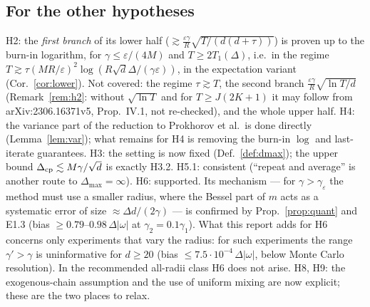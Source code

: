 \documentclass[11pt,a4paper]{article}
\numberwithin{equation}{section}
\theoremstyle{definition}
\theoremstyle{remark}
\newcommand{\Dmax}{\Delta_{\max}}\newcommand{\Dcp}{\Delta_{\rm cp}}
\begin{document}
\subsection{For the other hypotheses}
H2: the \emph{first branch} of its lower half ($\gtrsim\frac{\varepsilon\gamma}R\sqrt{T/(d(d+\tau))}$) is proven up to the burn-in logarithm, for $\gamma\le\varepsilon/(4M)$ and $T\ge2T_1(\Delta)$, i.e.\ in the regime $T\gtrsim\tau(MR/\varepsilon)^2\log(R\sqrt d\Delta/(\gamma\varepsilon))$, in the expectation variant (Cor.~\ref{cor:lower}). Not covered: the regime $\tau\gtrsim T$, the second branch $\frac{\varepsilon\gamma}R\sqrt{\ln T/d}$ (Remark~\ref{rem:h2}: without $\sqrt{\ln T}$ and for $T\ge J(2K+1)$ it may follow from arXiv:2306.16371v5, Prop.~IV.1, not re-checked), and the whole upper half.
H4: the variance part of the reduction to Prokhorov et al.\ is done directly (Lemma~\ref{lem:var}); what remains for H4 is removing the burn-in $\log$ and last-iterate guarantees.
H3: the setting is now fixed (Def.~\ref{def:dmax}); the upper bound $\Dcp\lesssim M\gamma/\sqrt d$ is exactly H3.2.
H5.1: consistent (``repeat and average'' is another route to $\Dmax=\infty$).
H6: supported. Its mechanism --- for $\gamma>\gamma_\varepsilon$ the method must use a smaller radius, where the Bessel part of $m$ acts as a systematic error of size $\approx\Delta d/(2\gamma)$ --- is confirmed by Prop.~\ref{prop:quant} and E1.3 (bias $\ge0.79$--$0.98\,\Delta|\omega|$ at $\gamma_2=0.1\gamma_1$). What this report adds for H6 concerns only experiments that vary the radius: for such experiments the range $\gamma'>\gamma$ is uninformative for $d\ge20$ (bias $\le7.5\cdot10^{-4}\,\Delta|\omega|$, below Monte Carlo resolution). In the recommended all-radii class H6 does not arise.
H8, H9: the exogenous-chain assumption and the use of uniform mixing are now explicit; these are the two places to relax.
\end{document}
